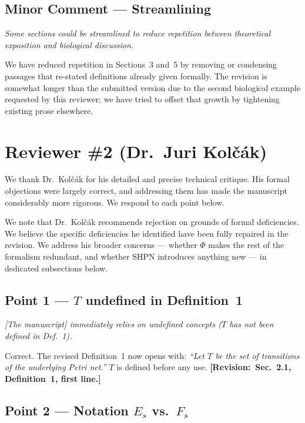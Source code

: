 \documentclass[11pt,letterpaper]{article}
\newcommand{\rquote}[1]{\begin{mdframed}[style=reviewquote]\textit{#1}\end{mdframed}}
\newcommand{\sref}[1]{\textbf{[Revision:~#1]}}
\begin{document}
\subsection*{Minor Comment --- Streamlining}

\rquote{Some sections could be streamlined to reduce repetition between
theoretical exposition and biological discussion.}

We have reduced repetition in Sections~3 and~5 by removing or condensing
passages that re-stated definitions already given formally. The revision is
somewhat longer than the submitted version due to the second biological example
requested by this reviewer; we have tried to offset that growth by tightening
existing prose elsewhere.

\bigskip

\section*{Reviewer \#2 (Dr.\ Juri Kolč{\'a}k)}

We thank Dr.\ Kolč{\'a}k for his detailed and precise technical critique. His
formal objections were largely correct, and addressing them has made the
manuscript considerably more rigorous. We respond to each point below.

We note that Dr.\ Kolč{\'a}k recommends rejection on grounds of formal
deficiencies. We believe the specific deficiencies he identified have been fully
repaired in the revision. We address his broader concerns --- whether $\Phi$
makes the rest of the formalism redundant, and whether SHPN introduces anything
new --- in dedicated subsections below.

\subsection*{Point 1 --- $T$ undefined in Definition~1}

\rquote{[The manuscript] immediately relies on undefined concepts ($T$ has not
been defined in Def.~1).}

Correct. The revised Definition~1 now opens with: \textit{``Let $T$ be the
set of transitions of the underlying Petri net.''} $T$ is defined before any
use. \sref{Sec.~2.1, Definition~1, first line.}

\subsection*{Point 2 --- Notation $E_s$ vs.\ $F_s$}
\end{document}
